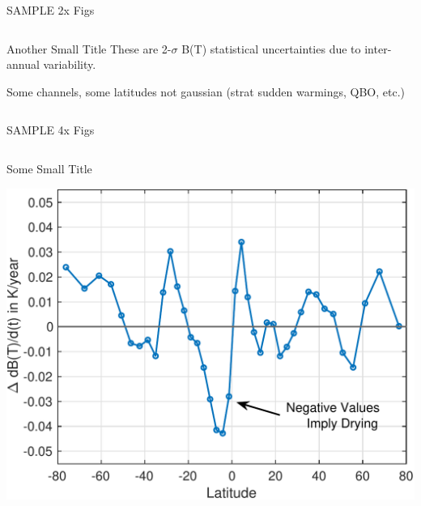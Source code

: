 \documentclass[10pt,t]{beamer}
\begin{document}
\begin{frame}[label={sec:org91507c7}]{SAMPLE 2x Figs}
\begin{columns}
\begin{column}{0.55\columnwidth}
\begin{block}{\footnotesize Another Small Title}
\footnotesize
These are 2-\(\sigma\) B(T) statistical uncertainties due to inter-annual variability.  

Some channels, some latitudes not gaussian (strat sudden warmings, QBO, etc.)
\end{block}
\end{column}
\end{columns}
\end{frame}



\begin{frame}[label={sec:orgd2a29c0}]{SAMPLE 4x Figs}
\vspace{-0.35in}

\begin{columns}
\begin{column}{0.45\columnwidth}
\begin{block}{\footnotesize Some Small Title}
\vspace{-0.1in}
\begin{center}
\includegraphics[width=\linewidth]{./Figs/Pdf/drying_in_convective_regions_v2.pdf}
\end{center}
\end{block}
\end{column}


\end{columns}
\end{frame}
\end{document}

